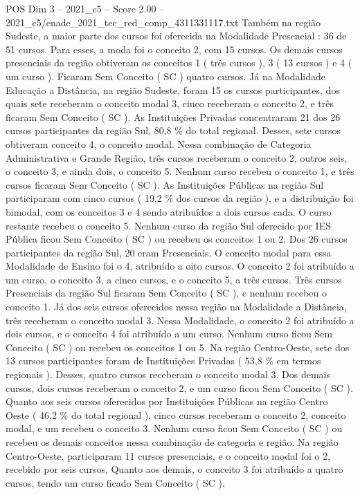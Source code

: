 \begin{textsample}{POS Dim 3 – 2021\_c5 – Score 2.00 – 2021\_c5/enade\_2021\_tec\_red\_comp\_4311331117.txt}
Também na região Sudeste, a maior parte dos cursos foi oferecida na Modalidade Presencial : 36 de 51 cursos.
Para esses, a moda foi o conceito 2, com 15 cursos.
Os demais cursos presenciais da região obtiveram os conceitos 1 ( três cursos ), 3 ( 13 cursos ) e 4 ( um curso ).
Ficaram Sem Conceito ( SC ) quatro cursos.
Já na Modalidade Educação a Distância, na região Sudeste, foram 15 os cursos participantes, dos quais sete receberam o conceito modal 3, cinco receberam o conceito 2, e três ficaram Sem Conceito ( SC ).
As Instituições Privadas concentraram 21 dos 26 cursos participantes da região Sul, 80,8 \% do total regional.
Desses, sete cursos obtiveram conceito 4, o conceito modal.
Nessa combinação de Categoria Administrativa e Grande Região, três cursos receberam o conceito 2, outros seis, o conceito 3, e ainda dois, o conceito 5.
Nenhum curso recebeu o conceito 1, e três cursos ficaram Sem Conceito ( SC ).
As Instituições Públicas na região Sul participaram com cinco cursos ( 19,2 \% dos cursos da região ), e a distribuição foi bimodal, com os conceitos 3 e 4 sendo atribuídos a dois cursos cada.
O curso restante recebeu o conceito 5.
Nenhum curso da região Sul oferecido por IES Pública ficou Sem Conceito ( SC ) ou recebeu os conceitos 1 ou 2.
Dos 26 cursos participantes da região Sul, 20 eram Presenciais.
O conceito modal para essa Modalidade de Ensino foi o 4, atribuído a oito cursos.
O conceito 2 foi atribuído a um curso, o conceito 3, a cinco cursos, e o conceito 5, a três cursos.
Três cursos Presenciais da região Sul ficaram Sem Conceito ( SC ), e nenhum recebeu o conceito 1.
Já dos seis cursos oferecidos nessa região na Modalidade a Distância, três receberam o conceito modal 3.
Nessa Modalidade, o conceito 2 foi atribuído a dois cursos, e o conceito 4 foi atribuído a um curso.
Nenhum curso ficou Sem Conceito ( SC ) ou recebeu os conceitos 1 ou 5.
Na região Centro-Oeste, sete dos 13 cursos participantes foram de Instituições Privadas ( 53,8 \% em termos regionais ).
Desses, quatro cursos receberam o conceito modal 3.
Dos demais cursos, dois cursos receberam o conceito 2, e um curso ficou Sem Conceito ( SC ).
Quanto aos seis cursos oferecidos por Instituições Públicas na região Centro Oeste ( 46,2 \% do total regional ), cinco cursos receberam o conceito 2, conceito modal, e um recebeu o conceito 3.
Nenhum curso ficou Sem Conceito ( SC ) ou recebeu os demais conceitos nessa combinação de categoria e região.
Na região Centro-Oeste, participaram 11 cursos presenciais, e o conceito modal foi o 2, recebido por seis cursos.
Quanto aos demais, o conceito 3 foi atribuído a quatro cursos, tendo um curso ficado Sem Conceito ( SC ).

\end{textsample}
